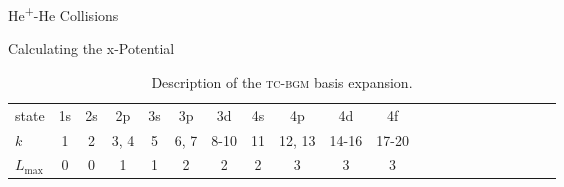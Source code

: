 \documentclass[a5paper, 9 pt]{extreport}
\begin{document}
\begin{chapter}{\texorpdfstring{He\textsuperscript{+}}{He+}-He Collisions \label{chap:hephe}}
\begin{section}{Calculating the x-Potential \label{sec:pot}}
      \begin{table}
         \centering
         \caption{Description of the \textsc{tc-bgm} basis expansion. \label{tab:basis}}
         \begin{tabular}{lcccccccccccccccccccc}
            \toprule
            state            & 1s & 2s & 2p   & 3s & 3p   & 3d      & 4s & 4p     & 4d      & 4f \\
            $k$              & 1  & 2  & 3, 4 & 5  & 6, 7 & 8{-}10  & 11 & 12, 13 & 14{-}16 & 17{-}20 \\
            $L_\mathrm{max}$ & 0  & 0  & 1    & 1  & 2    & 2       & 2  & 3      & 3       & 3 \\
            \bottomrule
         \end{tabular}
      \end{table}


\end{section}
\end{chapter}
\end{document}
